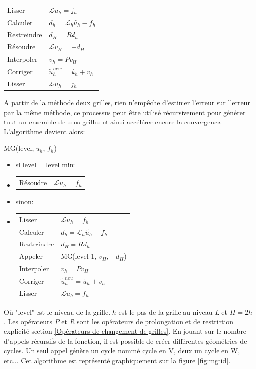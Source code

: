 \begin{tabular}{ll}
Lisser 		& 	$ \mathcal{L} u_h = f_h $\\
Calculer	&	$ d_h = \mathcal{L}_h \tilde{u_h} - f_h $\\
Restreindre	&	$ d_H = Rd_h$\\
Résoudre	&	$ \mathcal{L} v_H = -d_H $\\
Interpoler	&	$ v_h = Pv_H$\\
Corriger	&	$ \tilde{u}_h^{new} = \tilde{u_h} + v_h$\\
Lisser		&	$ \mathcal{L} u_h = f_h $
\end{tabular} 

A partir de la méthode deux grilles, rien n'empêche d'estimer l'erreur sur l'erreur par la même méthode, ce processus peut être utilisé récursivement pour générer tout un ensemble de sous grilles et ainsi accélérer encore la convergence.
L'algorithme devient alors:

MG(level, $u_h$, $f_h$)
\begin{itemize}	
\item 	si level = level min:
\item[]	\begin{tabular}{ll}
		Résoudre & $\mathcal{L} u_h = f_h $
		\end{tabular}
\item 	sinon:
\item[]	\begin{tabular}{ll}
		Lisser 		& 	$ \mathcal{L} u_h = f_h $\\
		Calculer	&	$ d_h = \mathcal{L}_h \tilde{u_h} - f_h $\\
		Restreindre	&	$ d_H = Rd_h$\\
		Appeler 	&	MG(level-1, $v_H$, $-d_H$) \\
		Interpoler	&	$ v_h = Pv_H$\\
		Corriger	&	$ \tilde{u}_h^{new} = \tilde{u_h} + v_h$\\
		Lisser		&	$ \mathcal{L} u_h = f_h $
		\end{tabular} 
\end{itemize}

Où "level" est le niveau de la grille. $h$ est le pas de la grille au niveau $L$ et $H = 2h$. 
Les opérateurs $P$ et $R$ sont les opérateurs de prolongation et de restriction explicité section \ref{Opérateurs de changement de grilles}.
En jouant sur le nombre d'appels récursifs de la fonction, il est possible de créer différentes géométries de cycles. 
Un seul appel génère un cycle nommé cycle en V, deux un cycle en W, etc... 
Cet algorithme est représenté graphiquement sur la figure \ref{fig:mgrid}.

